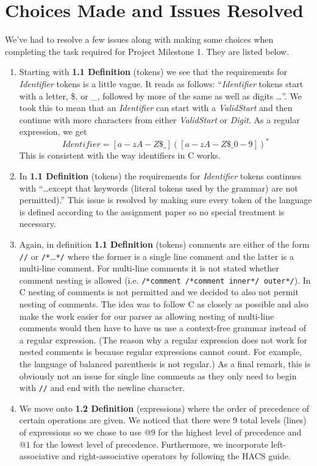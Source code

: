 \documentclass{article}
\begin{document}
\section{Choices Made and Issues Resolved}
We've had to resolve a few issues along with making some choices when completing the task required for Project Milestone 1. They are listed below.
\begin{enumerate}
    \item Starting with \textbf{1.1 Definition} (tokens) we see that the requirements for \textit{Identifier} tokens is a little vague. It reads as follows: ``\textit{Identifier} tokens start with a letter, \$, or \_, followed by more of the same as well as digits \dots''. We took this to mean that an \textit{Identifier} can start with a \textit{ValidStart} and then continue with more characters from either \textit{ValidStart} or \textit{Digit}. As a regular expression, we get
    \[
        \textit{Identifier}=[a-zA-Z\$\_]([a-zA-Z\$\_0-9])^{*}
    \]
    This is consistent with the way identifiers in C works.
    \item In \textbf{1.1 Definition} (tokens) the requirements for \textit{Identifier} tokens continues with ``\dots except that keywords (literal tokens used by the grammar) are not permitted).'' This issue is resolved by making sure every token of the language is defined according to the assignment paper so no special treatment is necessary.
    \item Again, in definition \textbf{1.1 Definition} (tokens) comments are either of the form \texttt{//} or \texttt{/*}\dots\texttt{*/} where the former is a single line comment and the latter is a multi-line comment. For multi-line comments it is not stated whether comment nesting is allowed (i.e. \texttt{/*comment /*comment inner*/ outer*/}). In C nesting of comments is not permitted and we decided to also not permit nesting of comments. The idea was to follow C as closely as possible and also make the work easier for our parser as allowing nesting of multi-line comments would then have to have us use a context-free grammar instead of a regular expression. (The reason why a regular expression does not work for nested comments is because regular expressions cannot count. For example, the language of balanced parenthesis is not regular.) As a final remark, this is obviously not an issue for single line comments as they only need to begin with \texttt{//} and end with the newline character.
    \item We move onto \textbf{1.2 Definition} (expressions) where the order of precedence of certain operations are given. We noticed that there were $9$ total levels (lines) of expressions so we chose to use $@9$ for the highest level of precedence and $@1$ for the lowest level of precedence. Furthermore, we incorporate left-associative and right-associative operators by following the HACS guide.

\end{enumerate}
\end{document}
